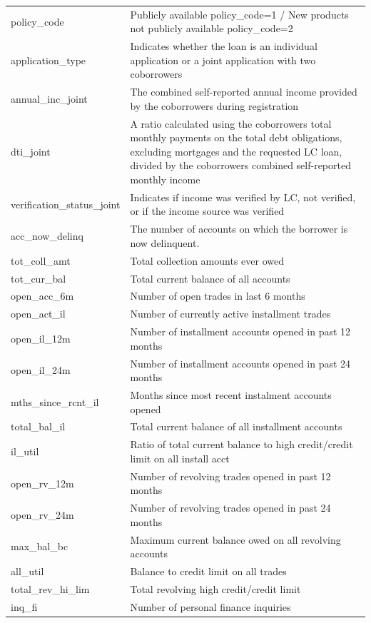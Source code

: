 \documentclass[11pt,]{report}
\begin{document}
\begin{longtable}[t]{>{\raggedright\arraybackslash}p{7cm}>{\raggedright\arraybackslash}p{7cm}}
\addlinespace
policy\_code & Publicly available policy\_code=1 / New products not publicly available policy\_code=2\\
application\_type & Indicates whether the loan is an individual application or a joint application with two coborrowers\\
annual\_inc\_joint & The combined self-reported annual income provided by the coborrowers during registration\\
dti\_joint & A ratio calculated using the coborrowers total monthly payments on the total debt obligations, excluding mortgages and the requested LC loan, divided by the coborrowers combined self-reported monthly income\\
verification\_status\_joint & Indicates if income was verified by LC, not verified, or if the income source was verified\\
\addlinespace
acc\_now\_delinq & The number of accounts on which the borrower is now delinquent.\\
tot\_coll\_amt & Total collection amounts ever owed\\
tot\_cur\_bal & Total current balance of all accounts\\
open\_acc\_6m & Number of open trades in last 6 months\\
open\_act\_il & Number of currently active installment trades\\
\addlinespace
open\_il\_12m & Number of installment accounts opened in past 12 months\\
open\_il\_24m & Number of installment accounts opened in past 24 months\\
mths\_since\_rcnt\_il & Months since most recent instalment accounts opened\\
total\_bal\_il & Total current balance of all installment accounts\\
il\_util & Ratio of total current balance to high credit/credit limit on all install acct\\
\addlinespace
open\_rv\_12m & Number of revolving trades opened in past 12 months\\
open\_rv\_24m & Number of revolving trades opened in past 24 months\\
max\_bal\_bc & Maximum current balance owed on all revolving accounts\\
all\_util & Balance to credit limit on all trades\\
total\_rev\_hi\_lim & Total revolving high credit/credit limit\\
\addlinespace
inq\_fi & Number of personal finance inquiries\\

\end{longtable}
\end{document}
